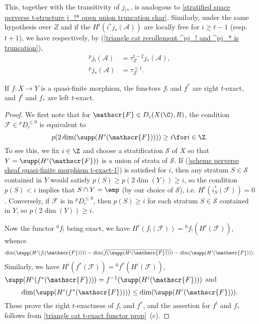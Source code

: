 This, together with the transitivity of $j_{!*}$, is analogous to \cref{stratified space perverse t-structure j_!* open union truncation char}. Similarly, under the same hypothesis over $Z$ and if the $H^i(i^*j_*(\mathscr{A}))$ are locally free for $i\geq t-1$ (resp. $t+1$), we have respectively, by (\cref{triangle cat recollement ^pj_! and ^pj_* is truncation}),
\begin{align}
{^p\!j_!}(\mathscr{A})&=\tau^{t-2}_Zj_*(\mathscr{A}),\label{scheme perverse sheaf ^pj_! char}\\
{^p\!j_*}(\mathscr{A})&=\tau^{\leq t}_Z.\label{scheme perverse sheaf ^pj_* char}
\end{align}

\begin{proposition}\label{scheme perverse sheaf quasi-finite morphism t-exact}
If $f:X\to Y$ is a quasi-finite morphism, the functors $f_!$ and $f^*$ are right $t$-exact, and $f^!$ and $f_*$ are left $t$-exact.
\end{proposition}
\begin{proof}
We first note that for $\mathscr{F}\in D_c(X(\C),R)$, the condition $\mathscr{F}\in {^p\!D_c^{\leq 0}}$ is equivalent to
\begin{equation}\label{scheme perverse sheaf quasi-finite morphism t-exact-1}
p(2\dim(\supp(H^i(\mathscr{F}))))\geq i\for i\in\Z.
\end{equation}
To see this, we fix $i\in\Z$ and choose a stratification $\mathcal{S}$ of $X$ so that $Y=\supp(H^i(\mathscr{F}))$ is a union of strata of $\mathcal{S}$. If (\ref{scheme perverse sheaf quasi-finite morphism t-exact-1}) is satisfied for $i$, then any stratum $S\in\mathcal{S}$ contained in $Y$ would satisfy $p(S)\geq p(2\dim(Y))\geq i$, so the condition $p(S)<i$ implies that $S\cap Y=\emp$ (by our choice of $\mathcal{S}$), i.e. $H^i(i_S^*(\mathscr{F}))=0$. Conversely, if $\mathscr{F}$ is in ${^p\!D_c^{\leq 0}}$, then $p(S)\geq i$ for each stratum $S\in\mathcal{S}$ contained in $Y$, so $p(2\dim(Y))\geq i$.\par
Now the functor ${^0f_!}$ being exact, we have $H^i(f_!(\mathscr{F}))={^0f_!}(H^i(\mathscr{F}))$, whence
\begin{gather*}
\dim(\supp(H^i(f_!(\mathscr{F}))))=\dim(\overline{f(\supp(H^i(\mathscr{F})))})=\dim(\supp(H^i(\mathscr{F}))).
\end{gather*}
Similarly, we have $H^i(f^*(\mathscr{F}))={^0f^*}(H^i(\mathscr{F}))$, $\supp(H^i(f^*(\mathscr{F})))=f^{-1}(\supp(H^i(\mathscr{F})))$ and
\[\dim(\supp(H^i(f^*(\mathscr{F}))))\leq\dim(\supp(H^i(\mathscr{F}))).\] These prove the right $t$-exactness of $f_!$ and $f^*$, and the assertion for $f^!$ and $f_*$ follows from \cref{triangle cat t-exact functor prop}~(c).
\end{proof}

